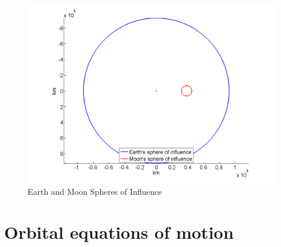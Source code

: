 \begin{figure} [h]
\begin{center}
\includegraphics[scale=0.4]{Images/Spheres-of-Influence.png}
\end{center}
\caption{Earth and Moon Spheres of Influence}
\label{fig:Spheres-of-Influence}
\end{figure}

\section{Orbital equations of motion} \label{sec:Orbital-equations-of-motion}

